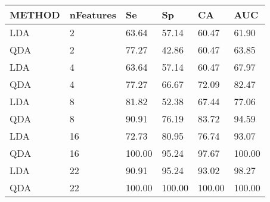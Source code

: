 \begin{table}[!ht]
    \centering
    \begin{tabular}{llllll}
    \hline
        METHOD & nFeatures & Se & Sp & CA & AUC \\ \hline
        LDA & 2 & 63.64 & 57.14 & 60.47 & 61.90 \\
        QDA & 2 & 77.27 & 42.86 & 60.47 & 63.85 \\
        LDA & 4 & 63.64 & 57.14 & 60.47 & 67.97 \\
        QDA & 4 & 77.27 & 66.67 & 72.09 & 82.47 \\
        LDA & 8 & 81.82 & 52.38 & 67.44 & 77.06 \\
        QDA & 8 & 90.91 & 76.19 & 83.72 & 94.59 \\
        LDA & 16 & 72.73 & 80.95 & 76.74 & 93.07 \\ 
        QDA & 16 & 100.00 & 95.24 & 97.67 & 100.00 \\ 
        LDA & 22 & 90.91 & 95.24 & 93.02 & 98.27 \\ 
        QDA & 22 & 100.00 & 100.00 & 100.00 & 100.00 \\ 
    \end{tabular}
\end{table}